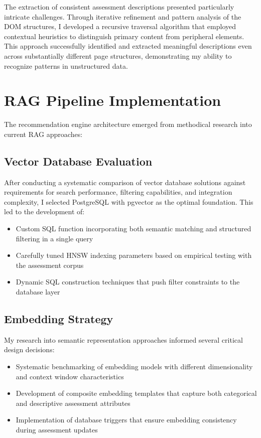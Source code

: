 \documentclass[10pt,a4paper,twocolumn]{article}
\begin{document}
The extraction of consistent assessment descriptions presented particularly intricate challenges. Through iterative refinement and pattern analysis of the DOM structures, I developed a recursive traversal algorithm that employed contextual heuristics to distinguish primary content from peripheral elements. This approach successfully identified and extracted meaningful descriptions even across substantially different page structures, demonstrating my ability to recognize patterns in unstructured data.

\section{RAG Pipeline Implementation}
\small
The recommendation engine architecture emerged from methodical research into current RAG approaches:

\subsection{Vector Database Evaluation}
\small
After conducting a systematic comparison of vector database solutions against requirements for search performance, filtering capabilities, and integration complexity, I selected PostgreSQL with pgvector as the optimal foundation. This led to the development of:
\begin{itemize}[leftmargin=*,itemsep=2pt,topsep=0pt,parsep=0pt]
    \item Custom SQL function incorporating both semantic matching and structured filtering in a single query
    \item Carefully tuned HNSW indexing parameters based on empirical testing with the assessment corpus
    \item Dynamic SQL construction techniques that push filter constraints to the database layer
\end{itemize}

\subsection{Embedding Strategy}
\small
My research into semantic representation approaches informed several critical design decisions:
\begin{itemize}[leftmargin=*,itemsep=2pt,topsep=0pt,parsep=0pt]
    \item Systematic benchmarking of embedding models with different dimensionality and context window characteristics
    \item Development of composite embedding templates that capture both categorical and descriptive assessment attributes
    \item Implementation of database triggers that ensure embedding consistency during assessment updates
\end{itemize}
\end{document}
